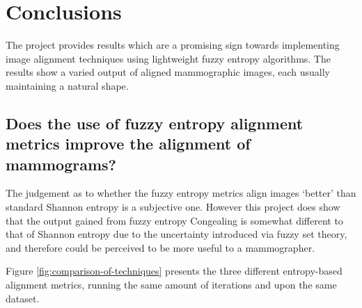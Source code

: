 \section{Conclusions}

The project provides results which are a promising sign towards implementing image alignment techniques using lightweight fuzzy entropy algorithms. The results show a varied output of aligned \gls{mammographic images}, each usually maintaining a natural shape.

\subsection{Does the use of fuzzy entropy alignment metrics improve the alignment of mammograms?}

The judgement as to whether the fuzzy entropy metrics align images `better' than standard Shannon entropy is a subjective one. However this project does show that the output gained from fuzzy entropy \gls{Congealing} is somewhat different to that of Shannon entropy due to the uncertainty introduced via fuzzy set theory, and therefore could be perceived to be more useful to a mammographer.

Figure \ref{fig:comparison-of-techniques} presents the three different entropy-based alignment metrics, running the same amount of iterations and upon the same dataset.

